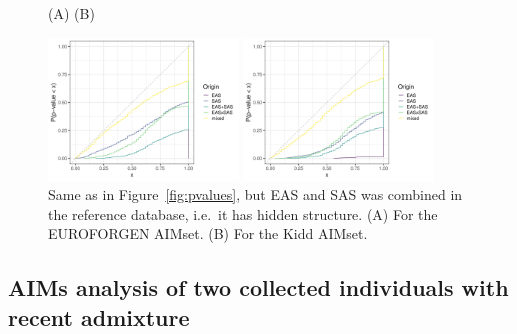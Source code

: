 \documentclass[12pt]{article}
\theoremstyle{definition}
\begin{document}
\begin{figure}[htb]
  \hspace{3cm} (A) \hspace{7cm} (B)
  \begin{center}
    \parbox[b]{0.45\textwidth}{\includegraphics[width=0.45\textwidth]{pvalues_EUROFORGEN_hiddenstructure.pdf}}    \parbox[b]{0.45\textwidth}{\includegraphics[width=0.45\textwidth]{pvalues_Kidd_hiddenstructure.pdf}}
  \end{center}
  \caption{\label{fig:hiddenstructure} Same as in Figure~\ref{fig:pvalues}, but EAS and SAS was combined in the reference database, i.e.\ it has hidden structure. (A) For the EUROFORGEN AIMset. (B) For the Kidd AIMset.}
\end{figure}

\newpage\mbox{}
\newpage


\subsection{AIMs analysis of two collected individuals with recent admixture}
\end{document}
